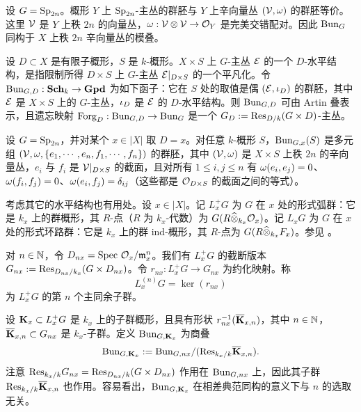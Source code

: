 \begin{exam} 设 $G=\textup{Sp}_{2n}$。概形 $Y$ 上 $\textup{Sp}_{2n}$-主丛的群胚与 $Y$ 上辛向量丛 $(\mathcal{V}, \omega)$ 的群胚等价。这里 $\mathcal{V}$ 是 $Y$ 上秩 $2n$ 的向量丛，$\omega: \mathcal{V}\otimes \mathcal{V}\to \mathcal{O}_{Y}$ 是完美交错配对。因此 $\textup{Bun}_{G}$ 同构于 $X$ 上秩 $2n$ 辛向量丛的模叠。
\end{exam}



\label{sss:level}

设 $D\subset X$ 是有限子概形，$S$ 是 $k$-概形。$X\times S$ 上 $G$-主丛 $\mathcal{E}$ 的一个 $D$-水平结构，是指限制所得 $D\times S$ 上 $G$-主丛 $\mathcal{E}|_{D\times S}$ 的一个平凡化。令 $\textup{Bun}_{G,D}: \mathbf{Sch}_{k}\to \mathbf{Gpd}$ 为如下函子：它在 $S$ 处的取值是偶 $(\mathcal{E},\iota_{D})$ 的群胚，其中 $\mathcal{E}$ 是 $X\times S$ 上的 $G$-主丛，$\iota_{D}$ 是 $\mathcal{E}$ 的 $D$-水平结构。则 $\textup{Bun}_{G,D}$ 可由 Artin 叠表示，且遗忘映射 $\textup{Forg}_{D}: \textup{Bun}_{G,D}\to \textup{Bun}_{G}$ 是一个 $G_{D}:=\textup{Res}_{D/k}(G\times D)$-主丛。


\begin{exam} 设 $G=\textup{Sp}_{2n}$，并对某个 $x\in |X|$ 取 $D=x$。对任意 $k$-概形 $S$，$\textup{Bun}_{G,x}(S)$ 是多元组 $(\mathcal{V}, \omega, \{e_{1},\cdots, e_{n}, f_{1},\cdots, f_{n}\})$ 的群胚，其中 $(\mathcal{V},\omega)$ 是 $X\times S$ 上秩 $2n$ 的辛向量丛，$e_{i}$ 与 $f_{i}$ 是 $\mathcal{V}|_{D\times S}$ 的截面，且对所有 $1\le i,j\le n$ 有 $\omega(e_{i},e_{j})=0$、$\omega(f_{i},f_{j})=0$、$\omega(e_{i},f_{j})=\delta_{ij}$（这些都是 $\mathcal{O}_{D\times S}$ 的截面之间的等式）。
\end{exam}


考虑其它的水平结构也有用处。设 $x\in |X|$。记 $L^{+}_{x}G$ 为 $G$ 在 $x$ 处的形式弧群：它是 $k_{x}$ 上的群概形，其 $R$-点（$R$ 为 $k_{x}$-代数）为 $G(R\widehat{\otimes}_{k_{x}} \mathcal{O}_{x})$。记 $L_{x}G$ 为 $G$ 在 $x$ 处的形式环路群：它是 $k_{x}$ 上的群 ind-概形，其 $R$-点为 $G(R\widehat{\otimes}_{k_{x}} F_{x})$。参见 \cite[\S1.a]{PR}。

对 $n\in \mathbb{N}$，令 $D_{nx}=\textup{Spec}\  \mathcal{O}_{x}/\mathfrak{m}^{n}_{x}$。我们有 $L^{+}_{x}G$ 的截断版本 $G_{nx}:=\textup{Res}_{D_{nx}/k_{x}}(G\times D_{nx})$。令 $r_{nx}: L^{+}_{x}G\to G_{nx}$ 为约化映射。称
\begin{equation*}
L^{(n)}_{x}G=\ker(r_{nx})
\end{equation*}
为 $L^{+}_{x}G$ 的第 $n$ 个主同余子群。

设 $\mathbf{K}_{x}\subset L^{+}_{x}G$ 是 $k_{x}$ 上的子群概形，且具有形状 $r_{nx}^{-1}(\overline{\mathbf{K}}_{x,n})$，其中 $n\in\mathbb{N}$，$\overline{\mathbf{K}}_{x,n}\subset G_{nx}$ 是 $k_{x}$-子群。定义 $\textup{Bun}_{G,\mathbf{K}_{x}}$ 为商叠
\begin{equation*}
\textup{Bun}_{G,\mathbf{K}_{x}}:=\textup{Bun}_{G, nx}/(\textup{Res}_{k_{x}/k}\overline{\mathbf{K}}_{x,n}).
\end{equation*}
注意 $\textup{Res}_{k_{x}/k}G_{nx}=\textup{Res}_{D_{nx}/k}(G\times D_{nx})$ 作用在 $\textup{Bun}_{G, nx}$ 上，因此其子群 $\textup{Res}_{k_{x}/k}\overline{\mathbf{K}}_{x,n}$ 也作用。容易看出，$\textup{Bun}_{G,\mathbf{K}_{x}}$ 在相差典范同构的意义下与 $n$ 的选取无关。



